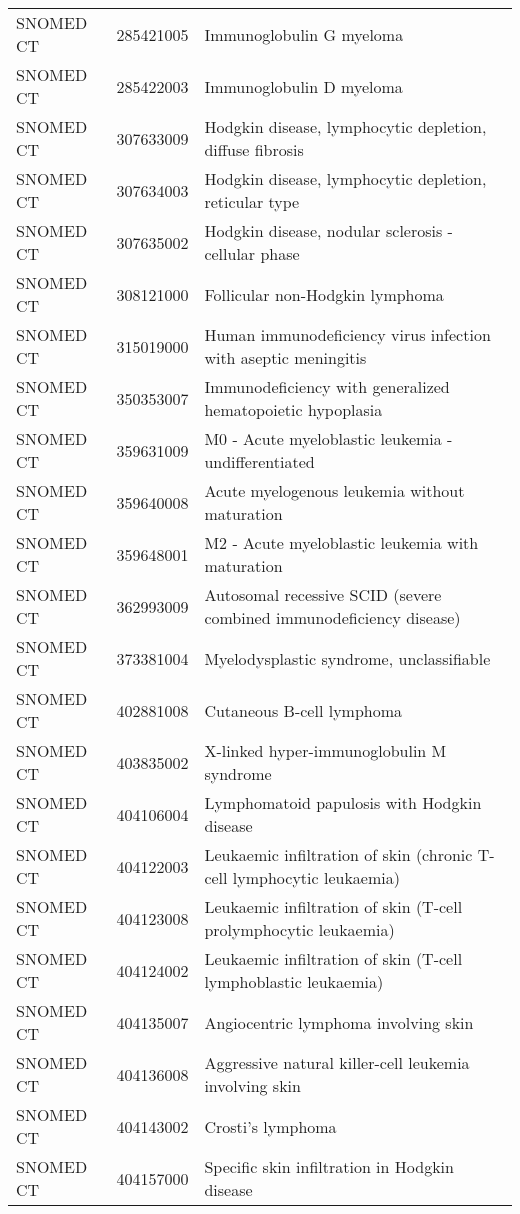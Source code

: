 \begin{table}[ht]
\begin{tabular}{lll}
  SNOMED CT & 285421005 & Immunoglobulin G myeloma \\ 
  SNOMED CT & 285422003 & Immunoglobulin D myeloma \\ 
  SNOMED CT & 307633009 & Hodgkin disease, lymphocytic depletion, diffuse fibrosis \\ 
  SNOMED CT & 307634003 & Hodgkin disease, lymphocytic depletion, reticular type \\ 
  SNOMED CT & 307635002 & Hodgkin disease, nodular sclerosis - cellular phase \\ 
  SNOMED CT & 308121000 & Follicular non-Hodgkin lymphoma \\ 
  SNOMED CT & 315019000 & Human immunodeficiency virus infection with aseptic meningitis \\ 
  SNOMED CT & 350353007 & Immunodeficiency with generalized hematopoietic hypoplasia \\ 
  SNOMED CT & 359631009 & M0 - Acute myeloblastic leukemia - undifferentiated \\ 
  SNOMED CT & 359640008 & Acute myelogenous leukemia without maturation \\ 
  SNOMED CT & 359648001 & M2 - Acute myeloblastic leukemia with maturation \\ 
  SNOMED CT & 362993009 & Autosomal recessive SCID (severe combined immunodeficiency disease) \\ 
  SNOMED CT & 373381004 & Myelodysplastic syndrome, unclassifiable \\ 
  SNOMED CT & 402881008 & Cutaneous B-cell lymphoma \\ 
  SNOMED CT & 403835002 & X-linked hyper-immunoglobulin M syndrome \\ 
  SNOMED CT & 404106004 & Lymphomatoid papulosis with Hodgkin disease \\ 
  SNOMED CT & 404122003 & Leukaemic infiltration of skin (chronic T-cell lymphocytic leukaemia) \\ 
  SNOMED CT & 404123008 & Leukaemic infiltration of skin (T-cell prolymphocytic leukaemia) \\ 
  SNOMED CT & 404124002 & Leukaemic infiltration of skin (T-cell lymphoblastic leukaemia) \\ 
  SNOMED CT & 404135007 & Angiocentric lymphoma involving skin \\ 
  SNOMED CT & 404136008 & Aggressive natural killer-cell leukemia involving skin \\ 
  SNOMED CT & 404143002 & Crosti's lymphoma \\ 
  SNOMED CT & 404157000 & Specific skin infiltration in Hodgkin disease \\ 

\end{tabular}
\end{table}
